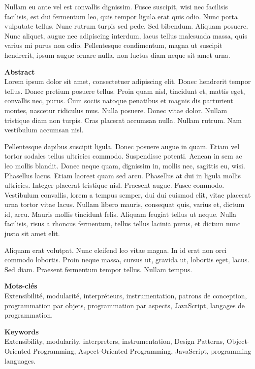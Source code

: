 \begin{titlepage}
\begin{addmargin}[-1cm]{-4cm}
\begin{minipage}[t]{9cm}
Nullam eu ante vel est convallis dignissim.  Fusce suscipit, wisi nec facilisis
facilisis, est dui fermentum leo, quis tempor ligula erat quis odio.  Nunc porta
vulputate tellus.  Nunc rutrum turpis sed pede.  Sed bibendum.  Aliquam posuere.
Nunc aliquet, augue nec adipiscing interdum, lacus tellus malesuada massa, quis
varius mi purus non odio.  Pellentesque condimentum, magna ut suscipit
hendrerit, ipsum augue ornare nulla, non luctus diam neque sit amet urna.
\end{minipage}%
\hspace{1cm}%
\begin{minipage}[t]{9cm}
{\sffamily\textbf{Abstract}}\\
Lorem ipsum dolor sit amet, consectetuer adipiscing elit.  Donec hendrerit
tempor tellus.  Donec pretium posuere tellus.  Proin quam nisl, tincidunt et,
mattis eget, convallis nec, purus.  Cum sociis natoque penatibus et magnis dis
parturient montes, nascetur ridiculus mus.  Nulla posuere.  Donec vitae dolor.
Nullam tristique diam non turpis.  Cras placerat accumsan nulla.  Nullam rutrum.
Nam vestibulum accumsan nisl.

Pellentesque dapibus suscipit ligula.  Donec posuere augue in quam.  Etiam vel
tortor sodales tellus ultricies commodo.  Suspendisse potenti.  Aenean in sem ac
leo mollis blandit.  Donec neque quam, dignissim in, mollis nec, sagittis eu,
wisi.  Phasellus lacus.  Etiam laoreet quam sed arcu.  Phasellus at dui in
ligula mollis ultricies.  Integer placerat tristique nisl.  Praesent augue.
Fusce commodo.  Vestibulum convallis, lorem a tempus semper, dui dui euismod
elit, vitae placerat urna tortor vitae lacus.  Nullam libero mauris, consequat
quis, varius et, dictum id, arcu.  Mauris mollis tincidunt felis.  Aliquam
feugiat tellus ut neque.  Nulla facilisis, risus a rhoncus fermentum, tellus
tellus lacinia purus, et dictum nunc justo sit amet elit.

Aliquam erat volutpat.  Nunc eleifend leo vitae magna.  In id erat non orci
commodo lobortis.  Proin neque massa, cursus ut, gravida ut, lobortis eget,
lacus.  Sed diam.  Praesent fermentum tempor tellus.  Nullam tempus.
\end{minipage}

\vfill
\noindent
\begin{minipage}[t]{9cm}
{\sffamily\textbf{Mots-clés}}\\
Extensibilité, modularité, interpréteurs, instrumentation, patrons de
conception, programmation par objets, programmation par aspects, JavaScript,
langages de programmation.
\end{minipage}%
\hspace{1cm}
\begin{minipage}[t]{9cm}
{\sffamily\textbf{Keywords}}\\
Extensibility, modularity, interpreters, instrumentation, Design Patterns,
Object-Oriented Programming, Aspect-Oriented Programming, JavaScript,
programming languages.
\end{minipage}
\end{addmargin}
\end{titlepage}


